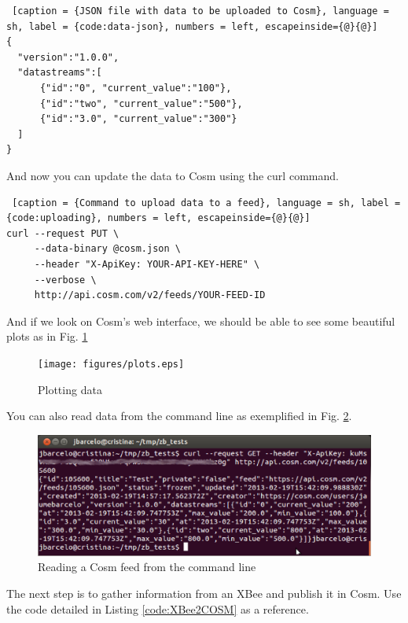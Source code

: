 \begin{lstlisting} [caption = {JSON file with data to be uploaded to Cosm}, language = sh, label = {code:data-json}, numbers = left, escapeinside={@}{@}]
{
  "version":"1.0.0",
  "datastreams":[
      {"id":"0", "current_value":"100"},
      {"id":"two", "current_value":"500"},
      {"id":"3.0", "current_value":"300"}
  ]
}
\end{lstlisting}

And now you can update the data to Cosm using the curl command.

\begin{lstlisting} [caption = {Command to upload data to a feed}, language = sh, label = {code:uploading}, numbers = left, escapeinside={@}{@}]
curl --request PUT \
     --data-binary @cosm.json \
     --header "X-ApiKey: YOUR-API-KEY-HERE" \
     --verbose \
     http://api.cosm.com/v2/feeds/YOUR-FEED-ID
\end{lstlisting}

And if we look on Cosm's web interface, we should be able to see some beautiful plots as in Fig. \ref{fig:plots}

\begin{figure}[htbp]
  \centering
  \texttt{[image: figures/plots.eps]}
  \caption{Plotting data}
  \label{fig:plots}
\end{figure}

You can also read data from the command line as exemplified in Fig. \ref{fig:reading-cosm}.

\begin{figure}[htbp]
  \centering
  \includegraphics[width=0.9\linewidth]{figures/reading-cosm.eps}
  \caption{Reading a Cosm feed from the command line}
  \label{fig:reading-cosm}
\end{figure}

The next step is to gather information from an XBee and publish it in Cosm.
Use the code detailed in Listing \ref{code:XBee2COSM} as a reference.

